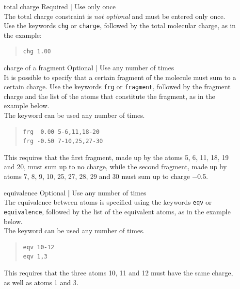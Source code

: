 \documentclass[a4paper]{report}
\begin{document}
\begin{itemize}
\item[total charge] Required | Use only once \\
  The total charge constraint is \emph{not optional} and must be entered only once. Use the keywords \texttt{chg} or \texttt{charge}, followed by the total molecular charge, as in the example:
\begin{framed}
\begin{quote}
\begin{verbatim}
chg 1.00
\end{verbatim}
\end{quote}
\end{framed}

\item[charge of a fragment] Optional | Use any number of times \\
It is possible to specify that a certain fragment of the molecule must sum to a certain charge. Use the keywords \texttt{frg} or \texttt{fragment}, followed by the fragment
charge and the list of the atoms that constitute the fragment, as in the example below. \\
The keyword can be used any number of times.
\begin{framed}
\begin{quote}
\begin{verbatim}
frg  0.00 5-6,11,18-20
frg -0.50 7-10,25,27-30
\end{verbatim}
\end{quote}
\end{framed}
This requires that the first fragment, made up by the atoms 5, 6, 11, 18, 19 and 20, must
sum up to no charge, while the second fragment, made up by atoms 7, 8, 9, 10, 25, 27, 28, 29 and 30 must sum up to charge $-$0.5.

\item[equivalence] Optional | Use any number of times \\
The equivalence between atoms is specified using the keywords \texttt{eqv} or \texttt{equivalence}, followed by the list of the equivalent atoms, as in the example below. \\
The keyword can be used any number of times.
\begin{framed}
\begin{quote}
\begin{verbatim}
eqv 10-12
eqv 1,3
\end{verbatim}
\end{quote}
\end{framed}
This requires that the three atoms 10, 11 and 12 must have the same charge, as well as atoms 1 and 3.


\end{itemize}
\end{document}
